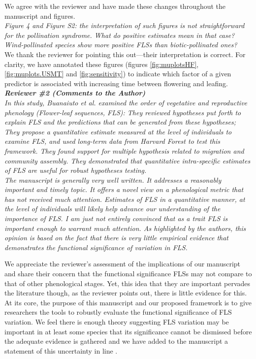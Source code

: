 \documentclass{article}[11pt]
\begin{document}
\noindent We agree with the reviewer and have made these changes throughout the manuscript and figures.\\

\emph{Figure 4 and Figure S2: the interpretation of such figures is not straightforward for the pollination syndrome. What do positive estimates mean in that case? Wind-pollinated species show more positive FLSs than biotic-pollinated ones?}\\

\noindent We thank the reviewer for pointing this out---their interpretation is correct. For clarity, we have annotated these figures (figures \ref{fig:muplotsHF}, \ref{fig:muplots.USMT} and \ref{fig:sensitivity}) to indicate which factor of a given predictor is associated with increasing time between flowering and leafing.\\

\emph{{\bf Reviewer \#2 (Comments to the Author)}}\\

\emph{In this study, Buanaiuto et al. examined the order of vegetative and reproductive phenology (Flower-leaf sequences, FLS): They reviewed hypotheses put forth to explain FLS and the predictions that can be generated from these hypotheses; They propose a  quantitative estimate measured at the level of individuals to examine FLS, and used long-term data from Harvard Forest to test this framework. They found support for multiple hypothesis related to migration and community assembly. They demonstrated that quantitative intra-specific estimates of FLS are useful for robust hypotheses testing.}\\

\emph{The manuscript is generally very well written. It addresses a reasonably important and timely topic. It offers a novel view on a phenological metric that has not received much attention. Estimates of FLS in a quantitative manner, at the level of individuals will likely help advance our understanding of the importance of FLS. I am just not entirely convinced that as a trait FLS is important enough to warrant much attention. As highlighted by the authors, this opinion is based on the fact that there is very little empirical evidence that demonstrates the functional significance of variation in FLS.}

\noindent We appreciate the reviewer's assessment of the implications of our manuscript and share their concern that the functional significance FLSs may not compare to that of other phenological stages. Yet, this idea that they are important pervades the literature \citep[e.g.][]{Rathcke_1985,Gougherty2018} though, as the reviewer points out, there is little evidence for this. At its core, the purpose of this manuscript and our proposed framework is to give researchers the tools to robustly evaluate the functional significance of FLS variation. We feel there is enough theory suggesting FLS variation may be important in at least some species that its significance cannot be dismissed before the adequate evidence is gathered and we have added to the manuscript a statement of this uncertainty in line . \\
\end{document}
